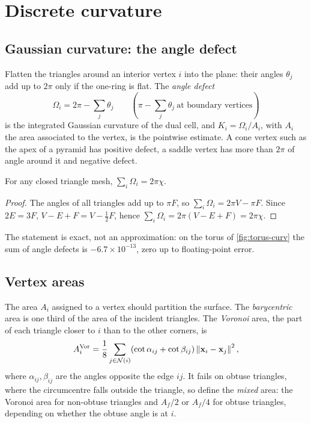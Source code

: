 
\section{Discrete curvature}

\subsection{Gaussian curvature: the angle defect}

Flatten the triangles around an interior vertex $i$ into the plane: their angles $\theta_j$ add
up to $2\pi$ only if the one-ring is flat. The \emph{angle defect}
\begin{equation}
\Omega_i=2\pi-\sum_{j}\theta_j \qquad(\pi-\sum_j\theta_j\ \text{at boundary vertices})
\end{equation}
is the integrated Gaussian curvature of the dual cell, and $K_i=\Omega_i/A_i$, with $A_i$ the area
associated to the vertex, is the pointwise estimate. A cone vertex such as the apex of a pyramid
has positive defect, a saddle vertex has more than $2\pi$ of angle around it and negative defect.

\begin{proposition}
For any closed triangle mesh, $\sum_i\Omega_i=2\pi\chi$.
\end{proposition}
\begin{proof}
The angles of all triangles add up to $\pi F$, so $\sum_i\Omega_i=2\pi V-\pi F$. Since $2E=3F$,
$V-E+F=V-\tfrac12F$, hence $\sum_i\Omega_i=2\pi(V-E+F)=2\pi\chi$.
\end{proof}
The statement is exact, not an approximation: on the torus of \cref{fig:torus-curv} the sum of
angle defects is $-6.7\times10^{-13}$, zero up to floating-point error.

\subsection{Vertex areas}

The area $A_i$ assigned to a vertex should partition the surface. The \emph{barycentric} area is
one third of the area of the incident triangles. The \emph{Voronoi} area, the part of each triangle
closer to $i$ than to the other corners, is
\begin{equation}
A_i^{\mathrm{Vor}}=\frac18\sum_{j\in\mathcal N(i)}(\cot\alpha_{ij}+\cot\beta_{ij})\left\lVert \mathbf{x}_i-\mathbf{x}_j\right\rVert^2,
\end{equation}
where $\alpha_{ij},\beta_{ij}$ are the angles opposite the edge $ij$. It fails on obtuse
triangles, where the circumcentre falls outside the triangle, so \citet{Meyer2003} define the
\emph{mixed} area: the Voronoi area for non-obtuse triangles and $A_f/2$ or $A_f/4$ for obtuse
triangles, depending on whether the obtuse angle is at $i$.

